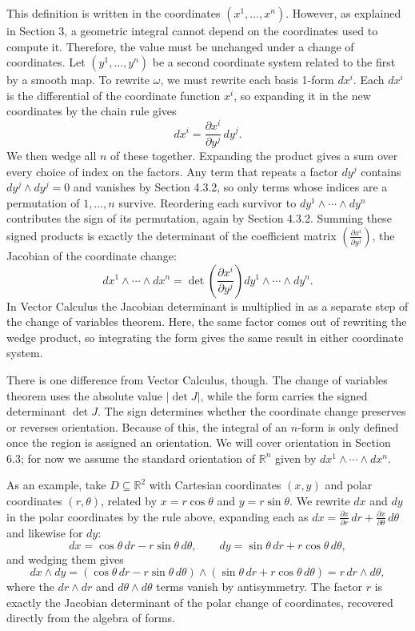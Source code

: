 \documentclass[12pt]{article}
\newcommand{\R}{\mathbb{R}}
\newcommand{\p}{\partial}
\begin{document}
This definition is written in the coordinates $(x^1, \dots, x^n)$. However, as explained in Section 3, a geometric integral cannot depend on the coordinates used to compute it. Therefore, the value must be unchanged under a change of coordinates. Let $(y^1, \dots, y^n)$ be a second coordinate system related to the first by a smooth map. To rewrite $\omega$, we must rewrite each basis 1-form $dx^i$. Each $dx^i$ is the differential of the coordinate function $x^i$, so expanding it in the new coordinates by the chain rule gives
\[
dx^i = \frac{\p x^i}{\p y^j}\,dy^j.
\]
We then wedge all $n$ of these together. Expanding the product gives a sum over every choice of index on the factors. Any term that repeats a factor $dy^j$ contains $dy^j \wedge dy^j = 0$ and vanishes by Section 4.3.2, so only terms whose indices are a permutation of $1, \dots, n$ survive. Reordering each survivor to $dy^1 \wedge \cdots \wedge dy^n$ contributes the sign of its permutation, again by Section 4.3.2. Summing these signed products is exactly the determinant of the coefficient matrix $\left(\frac{\p x^i}{\p y^j}\right)$, the Jacobian of the coordinate change:
\[
dx^1 \wedge \cdots \wedge dx^n = \det\!\left(\frac{\p x^i}{\p y^j}\right) dy^1 \wedge \cdots \wedge dy^n.
\]
In Vector Calculus the Jacobian determinant is multiplied in as a separate step of the change of variables theorem. Here, the same factor comes out of rewriting the wedge product, so integrating the form gives the same result in either coordinate system.

There is one difference from Vector Calculus, though. The change of variables theorem uses the absolute value $|\det J|$, while the form carries the signed determinant $\det J$. The sign determines whether the coordinate change preserves or reverses orientation. Because of this, the integral of an $n$-form is only defined once the region is assigned an orientation. We will cover orientation in Section 6.3; for now we assume the standard orientation of $\R^n$ given by $dx^1 \wedge \cdots \wedge dx^n$.

As an example, take $D \subseteq \R^2$ with Cartesian coordinates $(x,y)$ and polar coordinates $(r,\theta)$, related by $x = r\cos\theta$ and $y = r\sin\theta$. We rewrite $dx$ and $dy$ in the polar coordinates by the rule above, expanding each as $dx = \frac{\p x}{\p r}\,dr + \frac{\p x}{\p \theta}\,d\theta$ and likewise for $dy$:
\[
dx = \cos\theta\,dr - r\sin\theta\,d\theta, \qquad dy = \sin\theta\,dr + r\cos\theta\,d\theta,
\]
and wedging them gives
\[
dx \wedge dy = (\cos\theta\,dr - r\sin\theta\,d\theta) \wedge (\sin\theta\,dr + r\cos\theta\,d\theta) = r\,dr \wedge d\theta,
\]
where the $dr \wedge dr$ and $d\theta \wedge d\theta$ terms vanish by antisymmetry. The factor $r$ is exactly the Jacobian determinant of the polar change of coordinates, recovered directly from the algebra of forms.
\end{document}
